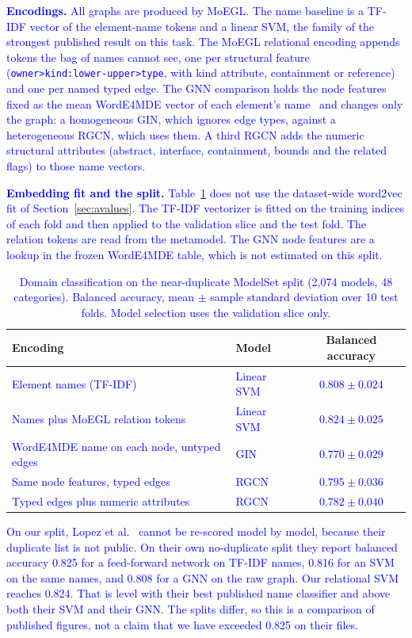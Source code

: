 \documentclass[journal,article,submit,moreauthors,technologies]{Definitions/mdpi}
\newcommand{\rev}[1]{\textcolor{blue}{#1}}
\begin{document}
\rev{\textbf{Encodings.} All graphs are produced by MoEGL. The name baseline is a TF-IDF vector of the element-name tokens and a linear SVM, the family of the strongest published result on this task. The MoEGL relational encoding appends tokens the bag of names cannot see, one per structural feature (\texttt{owner>kind:lower-upper>type}, with kind attribute, containment or reference) and one per named typed edge. The GNN comparison holds the node features fixed as the mean WordE4MDE vector of each element's name~\cite{lopez2023word} and changes only the graph: a homogeneous GIN, which ignores edge types, against a heterogeneous RGCN, which uses them. A third RGCN adds the numeric structural attributes (abstract, interface, containment, bounds and the related flags) to those name vectors.}

\rev{\textbf{Embedding fit and the split.} Table~\ref{tab:learning} does not use the dataset-wide word2vec fit of Section~\ref{sec:avalues}. The TF-IDF vectorizer is fitted on the training indices of each fold and then applied to the validation slice and the test fold. The relation tokens are read from the metamodel. The GNN node features are a lookup in the frozen WordE4MDE table, which is not estimated on this split.}

\begin{table}[H]
\caption{\rev{Domain classification on the near-duplicate ModelSet split (2{,}074 models, 48 categories). Balanced accuracy, mean $\pm$ sample standard deviation over 10 test folds. Model selection uses the validation slice only.}\label{tab:learning}}
\centering
\small
\begin{tabular}{llc}
\toprule
\textbf{Encoding} & \textbf{Model} & \textbf{Balanced accuracy} \\
\midrule
\rev{Element names (TF-IDF)} & \rev{Linear SVM} & \rev{$0.808 \pm 0.024$} \\
\rev{Names plus MoEGL relation tokens} & \rev{Linear SVM} & \rev{$0.824 \pm 0.025$} \\
\rev{WordE4MDE name on each node, untyped edges} & \rev{GIN} & \rev{$0.770 \pm 0.029$} \\
\rev{Same node features, typed edges} & \rev{RGCN} & \rev{$0.795 \pm 0.036$} \\
\rev{Typed edges plus numeric attributes} & \rev{RGCN} & \rev{$0.782 \pm 0.040$} \\
\bottomrule
\end{tabular}
\end{table}

\rev{On our split, Lopez et al.~\cite{lopez2022classification} cannot be re-scored model by model, because their duplicate list is not public. On their own no-duplicate split they report balanced accuracy 0.825 for a feed-forward network on TF-IDF names, 0.816 for an SVM on the same names, and 0.808 for a GNN on the raw graph. Our relational SVM reaches 0.824. That is level with their best published name classifier and above both their SVM and their GNN. The splits differ, so this is a comparison of published figures, not a claim that we have exceeded 0.825 on their files.}
\end{document}
